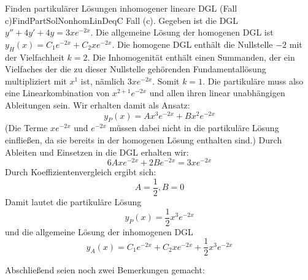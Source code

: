 \begin{example}{Finden partikulärer Lösungen inhomogener lineare DGL (Fall c)}{FindPartSolNonhomLinDeqC}
    Fall (c). Gegeben ist die DGL $y''+4y'+4y=3xe^{-2x}$. Die allgemeine Lösung der homogenen DGL ist $y_H(x) = C_1 e^{-2x} + C_2 x e^{-2x}$. Die homogene DGL enthält die Nullstelle $-2$ mit der Vielfachheit $k=2$. Die Inhomogenität enthält einen Summanden, der ein Vielfaches der die zu dieser Nullstelle gehörenden Fundamentallösung multipliziert mit $x^1$ ist, nämlich $3xe^{-2x}$. Somit $k=1$. Die partikuläre muss also eine Linearkombination von $x^{2+1} e^{-2x}$ und allen ihren linear unabhängigen Ableitungen sein. Wir erhalten damit als Ansatz:
    $$
        y_P(x) = Ax^3e^{-2x}+Bx^2 e^{-2x}
    $$
    (Die Terme $xe^{-2x}$ und $e^{-2x}$ müssen dabei nicht in die partikuläre Lösung einfließen, da sie bereits in der homogenen Lösung enthalten sind.) Durch Ableiten und Einsetzen in die DGL erhalten wir:
    $$
      6Axe^{-2x}  + 2B{e^{-2x}} = 3xe^{-2x}
    $$
    Durch Koeffizientenvergleich ergibt sich:
    $$
        A = \frac{1}{2}, B=0
    $$
    Damit lautet die partikuläre Lösung
    $$
        y_P(x) = \frac{1}{2}x^3e^{-2x}
    $$
    und die allgemeine Lösung der inhomogenen DGL
    $$
        y_A(x) = C_1 e^{-2x} + C_2 x e^{-2x} + \frac{1}{2}x^3e^{-2x}
    $$
\end{example}

Abschließend seien noch zwei Bemerkungen gemacht:

